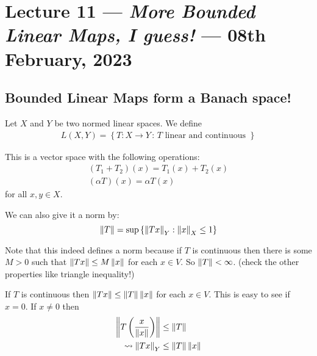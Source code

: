 \section{Lecture 11 --- \textit{More Bounded Linear Maps, I guess!} --- 08th February, 2023}
\horz
\subsection{Bounded Linear Maps form a Banach space!}
Let $X$ and $Y$ be two normed linear spaces. We define
\begin{align*}
    L(X,Y) =\left\{ T: X\to Y \, : \, T \text{ linear and continuous } \right\}
\end{align*}

This is a vector space with the following operations:
\begin{align*}
    (T_{1} + T_{2})(x) = T_{1} (x) + T_{2} (x) \\
    (\alpha T ) (x) = \alpha T(x)
\end{align*}
for all $x,y \in X$.

We can also give it a norm by:
\begin{equation*}
    \left\lVert T \right\rVert=\sup \left\{ \left\lVert Tx \right\rVert_{Y} : \left\lVert x \right\rVert_{X} \le 1 \right\}
\end{equation*}

Note that this indeed defines a norm because if $T$ is continuous then there is some $M > 0$ such that $\left\lVert Tx \right\rVert \le M \left\lVert x \right\rVert$ for each $x \in V$. So $\left\lVert T \right\rVert < \infty$. (check the other properties like triangle inequality!)

\begin{observation}
    If $T$ is continuous then $\left\lVert Tx \right\rVert \le \left\lVert T \right\rVert\left\lVert x \right\rVert$ for each $x\in V$. This is easy to see if $x=0$. If $x\ne 0$ then 
    \begin{align*}
	\left\lVert T \left( \frac{x}{\left\lVert x \right\rVert} \right) \right\rVert &\le \left\lVert T \right\rVert \\
	\leadsto \left\lVert Tx \right\rVert_{Y} &\le \left\lVert T \right\rVert \left\lVert x \right\rVert
    \end{align*}
\end{observation}

